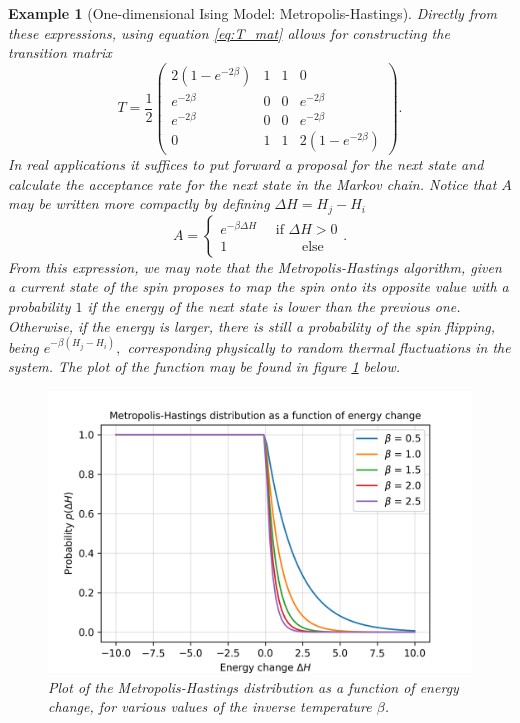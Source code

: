 \documentclass[]{article}
\numberwithin{equation}{section}
\theoremstyle{break}
\newtheorem*{example}{Example}
\begin{document}
\begin{example}[One-dimensional Ising Model: Metropolis-Hastings]
    Directly from these expressions, using equation \eqref{eq:T_mat} allows for constructing the transition matrix
    \[T = \frac{1}{2}\begin{pmatrix}
        2(1-e^{-2\beta}) & 1 & 1 & 0 \\
        e^{-2\beta} & 0 & 0 & e^{-2\beta} \\
        e^{-2\beta} & 0 & 0 & e^{-2\beta} \\
        0 & 1 & 1 & 2(1-e^{-2\beta})
    \end{pmatrix}.\]
    In real applications it suffices to put forward a proposal for the next state and calculate the acceptance rate for the next state in the Markov chain. Notice that $A$ may be written more compactly by defining $\Delta H = H_j - H_i$
    \[A = \begin{cases}
        e^{-\beta\Delta H} \quad \text{ if } \Delta H > 0 \\
        1\quad\quad\quad\quad\quad \text{ else}
    \end{cases}.\]
    From this expression, we may note that the Metropolis-Hastings algorithm, given a current state of the spin proposes to map the spin onto its opposite value with a probability $1$ if the energy of the next state is lower than the previous one. Otherwise, if the energy is larger, there is still a probability of the spin flipping, being $e^{-\beta(H_j - H_i)},$ corresponding physically to random thermal fluctuations in the system. The plot of the function may be found in figure \ref{fig:metropolis} below.
    \begin{figure}[H]
        \centering
        \includegraphics[scale=0.7]{figures/metropolis.png}
        \caption{Plot of the Metropolis-Hastings distribution as a function of energy change, for various values of the inverse temperature $\beta$.}
        \label{fig:metropolis}
    \end{figure}
\end{example}
\end{document}
